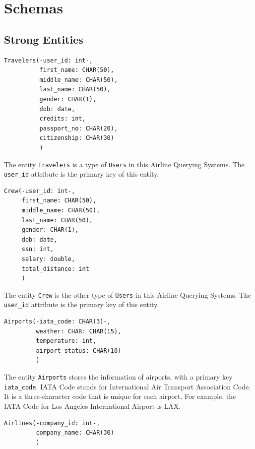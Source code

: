 \documentclass{article}
\begin{document}
	\section{Schemas}
	
	\subsection{Strong Entities}
	\begin{lstlisting}[keepspaces=true]
Travelers(-user_id: int-,
          first_name: CHAR(50),
          middle_name: CHAR(50),
          last_name: CHAR(50),
          gender: CHAR(1),
          dob: date,
          credits: int,
          passport_no: CHAR(20), 
          citizenship: CHAR(30)
          )
	\end{lstlisting}    
	
	The entity \texttt{Travelers} is a type of \texttt{Users} in this Airline Querying Systems. The 
	\texttt{user\_id} attribute is the primary key of this entity.
	
	\begin{lstlisting}[keepspaces=true]
Crew(-user_id: int-,
     first_name: CHAR(50),
     middle_name: CHAR(50),
     last_name: CHAR(50),
     gender: CHAR(1),
     dob: date,
     ssn: int, 
     salary: double, 
     total_distance: int
     )
	\end{lstlisting}    
	
	The entity \texttt{Crew} is the other type of \texttt{Users} in this Airline Querying Systems. The 
	\texttt{user\_id} attribute is the primary key of this entity.
	
	\begin{lstlisting}[keepspaces=true]
Airports(-iata_code: CHAR(3)-, 
         weather: CHAR: CHAR(15),
         temperature: int,
         airport_status: CHAR(10)
         )
	\end{lstlisting}    
	
	The entity \texttt{Airports} stores the information of airports, with a primary key \texttt{iata\_code}. IATA Code stands for International Air Transport Association Code. It is a three-character code that is unique for each airport. For example, the IATA Code for Los Angeles International Airport is LAX.
	
	\begin{lstlisting}[keepspaces=true]             
Airlines(-company_id: int-,
         company_name: CHAR(30)
         )
	\end{lstlisting}    
	
\end{document}

